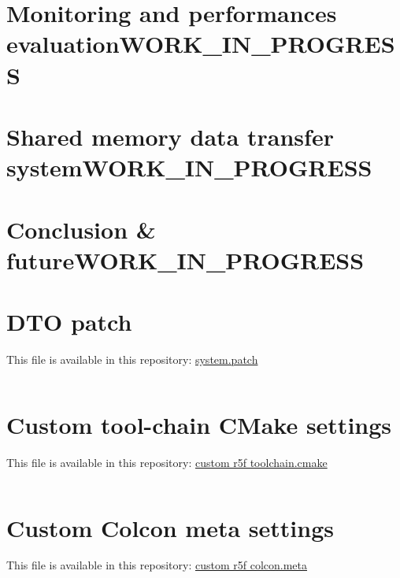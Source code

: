 \documentclass[10pt]{article}
\begin{document}
\section{Monitoring and performances evaluation\hfill{}\textsc{WORK\_IN\_PROGRESS}}
\label{sec:org54d0645}

\clearpage
\section{Shared memory data transfer system\hfill{}\textsc{WORK\_IN\_PROGRESS}}
\label{sec:org026388d}


\clearpage
\section{Conclusion \& future\hfill{}\textsc{WORK\_IN\_PROGRESS}}
\label{sec:org4e9a2db}


\clearpage
\appendix
\section{DTO patch}
\label{sec:orgdeacf38}
This file is available in this repository: \href{https://gitlab.com/sunoc/xilinx-kria-kv260-documentation/-/blob/b7300116e153f4b5a1542f8804e4646db8030033/src/system.patch}{system.patch}
\inputminted[linenos, frame=single]{diff}{./src/system.patch}

\clearpage
\section{Custom tool-chain CMake settings}
\label{sec:org6b09045}
This file is available in this repository: \href{https://gitlab.com/sunoc/xilinx-kria-kv260-documentation/-/blob/b7300116e153f4b5a1542f8804e4646db8030033/src/custom\_r5f\_toolchain.cmake}{custom r5f toolchain.cmake}
\inputminted[linenos, frame=single]{cmake}{./src/custom_r5f_toolchain.cmake}

\clearpage
\section{Custom Colcon meta settings}
\label{sec:org2d3055e}
This file is available in this repository: \href{https://gitlab.com/sunoc/xilinx-kria-kv260-documentation/-/blob/b7300116e153f4b5a1542f8804e4646db8030033/src/custom\_r5f\_colcon.meta}{custom r5f colcon.meta}
\inputminted[linenos, frame=single]{yaml}{./src/custom_r5f_colcon.meta}

\pagebreak
\end{document}
